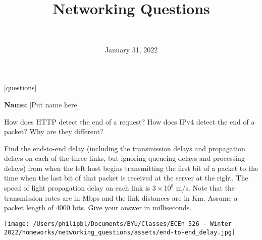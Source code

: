 \documentclass[
  addpoints, answers]{exam}
\title{Networking Questions}
\author{ \\ }
\date{January 31, 2022}
\begin{document}
\maketitle

\begin{center}
  \vspace{1cm}
  [questions]
  \vspace{1cm}
\end{center}

{\large \textbf{Name:} [Put name here]}


\newpage


\begin{questions}


\question[3] How does HTTP detect the end of a request? How does IPv4 detect the end of a packet? Why are they different?

\begin{solution}
\end{solution}


\newpage


\question[3] Find the end-to-end delay (including the transmission delays and propagation delays on each of the three links, but ignoring queueing delays and processing delays) from when the left host begins transmitting the first bit of a packet to the time when the last bit of that packet is received at the server at the right. The speed of light propagation delay on each link is $3 \times 10^8$ m/s. Note that the transmission rates are in Mbps and the link distances are in Km. Assume a packet length of 4000 bits. Give your answer in milliseconds.
\begin{center}
\texttt{[image: /Users/philipbl/Documents/BYU/Classes/ECEn 526 - Winter 2022/homeworks/networking\_questions/assets/end-to-end\_delay.jpg]}
\end{center}

\end{questions}
\end{document}
